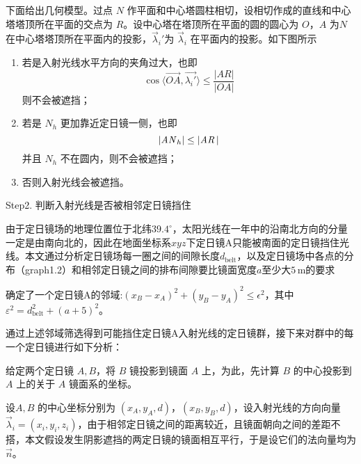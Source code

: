 \documentclass[../main.tex]{subfiles}
\begin{document}
下面给出几何模型。过点 \(N\) 作平面和中心塔圆柱相切，设相切作成的直线和中心塔塔顶所在平面的交点为 \(R\)。设中心塔在塔顶所在平面的圆的圆心为 \(O\)，\(A\) 为\(N\)在中心塔塔顶所在平面内的投影，\(\vec \lambda _{i} '\)为 \(\vec \lambda _{i}\) 在平面内的投影。如下图所示

\begin{enumerate}
\item 若是入射光线水平方向的夹角过大，也即
\begin{equation}
\cos \langle \overrightarrow {OA}, \vec {\lambda _{i} '} \rangle \le \frac{\vert AR \vert }{\vert OA \vert }
\end{equation}
则不会被遮挡；
\item 若是 \(N_{h}\) 更加靠近定日镜一侧，也即
\begin{equation}
\vert {\it A N}_{h}\vert \le \vert {\it AR\,} \vert
\end{equation}并且 \(N_{h}\) 不在圆内，则不会被遮挡；
\item 否则入射光线会被遮挡。
\end{enumerate}

Step2. 判断入射光线是否被相邻定日镜挡住

由于定日镜场的地理位置位于北纬\(39.4^{\circ}\)，太阳光线在一年中的沿南北方向的分量一定是由南向北的，因此在地面坐标系\(xyz\)下定日镜A只能被南面的定日镜挡住光线。本文通过分析定日镜场每一圈之间的间隙长度\(d_{\mathrm{belt}}\)，以及定日镜场中各点的分布（graph1.2）和相邻定日镜之间的排布间隙要比镜面宽度\(a\)至少大\(5 \, \mathrm{m}\)的要求

确定了一个定日镜A的邻域:\((x_B - x_A)^2 + (y_B - y_A)^2 \le \epsilon^2\)，其中\(\varepsilon^2=d_{\mathrm{belt}}^2+(a+5)^2\)。

通过上述邻域筛选得到可能挡住定日镜A入射光线的定日镜群，接下来对群中的每一个定日镜进行如下分析：

给定两个定日镜 \(A, B\)，将 \(B\) 镜投影到镜面 \(A\) 上，为此，先计算 \(B\) 的中心投影到 \(A\) 上的关于 \(A\) 镜面系的坐标。

设\(A,B\) 的中心坐标分别为 \((x_{A}, y_{A}, d)\)，\((x_{B}, y_{B}, d)\)，设入射光线的方向向量 \(\vec \lambda _{i} = (x_{i}, y_{i}, z_{i})\)，由于相邻定日镜之间的距离较近，且镜面朝向之间的差距不搭，本文假设发生阴影遮挡的两定日镜的镜面相互平行，于是设它们的法向量均为 \(\vec n\)。
\end{document}
